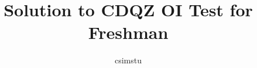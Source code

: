 \documentclass[a4paper]{article}
\begin{document}
\title{Solution to CDQZ OI Test for Freshman}
\author{csimstu}
\maketitle
\tableofcontents




\end{document}

